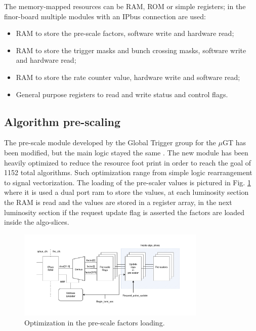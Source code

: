 \documentclass[../../main.tex]{subfiles}
\begin{document}
The memory-mapped resources can be RAM, ROM or simple registers; in the finor-board multiple modules with an IPbus connection are used:
\begin{itemize}
    \item RAM to store the pre-scale factors, software write and hardware read;
    \item RAM to store the trigger masks and bunch crossing masks, software write and hardware read;
    \item RAM to store the rate counter value, hardware write and software read;
    \item General purpose registers to read and write status and control flags.
\end{itemize}

\subsection{Algorithm pre-scaling}
\label{sec:Finor_presc}

The pre-scale module developed by the Global Trigger group for the $\mu$GT has been modified, but the main logic stayed the same \cite{uGT}. The new module has been heavily optimized to reduce the resource foot print in order to reach the goal of 1152 total algorithms. Such optimization range from simple logic rearrangement to signal vectorization. The loading of the pre-scaler values is pictured in Fig. \ref{fig:Pre-scaler-load} where it is used a dual port ram to store the values, at each luminosity section the RAM is read and the values are stored in a register array, in the next luminosity section if the request update flag is asserted the factors are loaded inside the algo-slices.

\begin{figure}[h]
    \centering
    \includegraphics[width=0.8\textwidth]{sections/06/Images/Presc_fact_reg.pdf}
    \caption{Optimization in the pre-scale factors loading.}
    \label{fig:Pre-scaler-load}
\end{figure}
\end{document}
